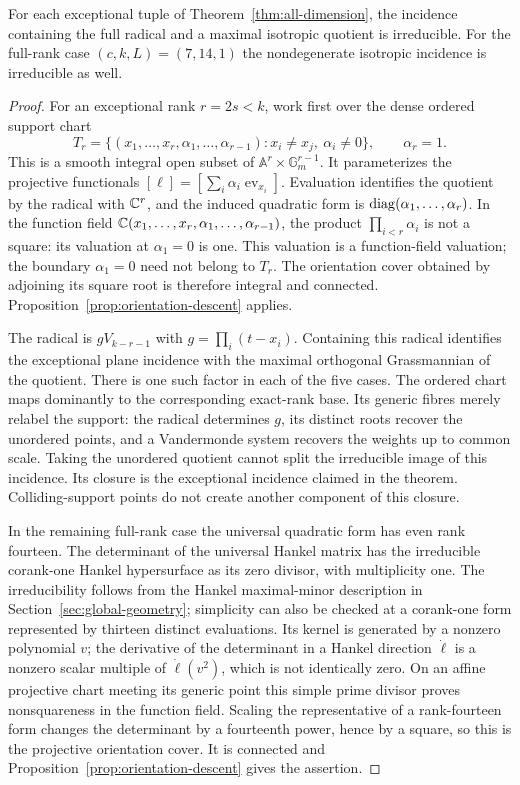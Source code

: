\begin{proposition}
\label{prop:exceptional-orientation-base}
For each exceptional tuple of Theorem~\ref{thm:all-dimension}, the
incidence containing the full radical and a maximal isotropic quotient
is irreducible. For the full-rank case $(c,k,L)=(7,14,1)$ the
nondegenerate isotropic incidence is irreducible as well.
\end{proposition}
\begin{proof}
For an exceptional rank $r=2s<k$, work first over the dense ordered
support chart
\[
 T_r=\{(x_1,\ldots,x_r,\alpha_1,\ldots,\alpha_{r-1}):
 x_i\ne x_j,\ \alpha_i\ne0\},\qquad \alpha_r=1.
\]
This is a smooth integral open subset of
$\mathbb A^r\times\mathbb G_m^{r-1}$. It parameterizes the
projective functionals $[\ell]=[\sum_i\alpha_i\operatorname{ev}_{x_i}]$.
Evaluation identifies the quotient by the radical with $\mathbb C^r$,
and the induced quadratic form is $\operatorname{diag}(\alpha_1,\ldots,\alpha_r)$.
In the function field
$\mathbb C(x_1,\ldots,x_r,\alpha_1,\ldots,\alpha_{r-1})$, the product
$\prod_{i<r}\alpha_i$ is not a square: its valuation at $\alpha_1=0$
is one. This valuation is a function-field valuation; the boundary
$\alpha_1=0$ need not belong to $T_r$. The orientation cover obtained
by adjoining its square root is therefore integral and connected.
Proposition~\ref{prop:orientation-descent} applies.

The radical is $gV_{k-r-1}$ with $g=\prod_i(t-x_i)$. Containing
this radical identifies the exceptional plane incidence with the
maximal orthogonal Grassmannian of the quotient. There is one such
factor in each of the five cases. The ordered chart maps dominantly
to the corresponding exact-rank base. Its generic fibres merely
relabel the support: the radical determines $g$, its distinct roots
recover the unordered points, and a Vandermonde system recovers the
weights up to common scale. Taking the unordered quotient cannot
split the irreducible image of this incidence. Its closure is the
exceptional incidence claimed in the theorem. Colliding-support
points do not create another component of this closure.

In the remaining full-rank case the universal quadratic form has
even rank fourteen. The determinant of the universal Hankel matrix
has the irreducible corank-one Hankel hypersurface as its zero divisor,
with multiplicity one. The irreducibility follows from the Hankel
maximal-minor description in Section~\ref{sec:global-geometry}; simplicity can
also be checked at a corank-one form represented by thirteen distinct
evaluations. Its kernel is generated by a nonzero polynomial $v$;
the derivative of the determinant in a Hankel direction $\dot\ell$
is a nonzero scalar multiple of $\dot\ell(v^2)$, which is not
identically zero. On an affine projective chart meeting its generic
point this simple prime divisor proves nonsquareness in the function
field. Scaling the representative of a rank-fourteen form changes
the determinant by a fourteenth power, hence by a square, so this is
the projective orientation cover. It is connected and
Proposition~\ref{prop:orientation-descent} gives the assertion.
\end{proof}
